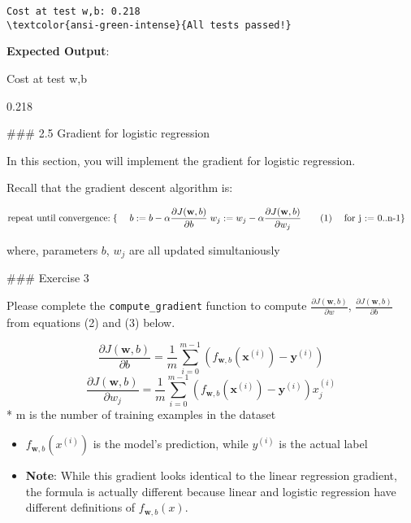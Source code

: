 \documentclass[11pt]{article}
\begin{document}
    \begin{Verbatim}[commandchars=\\\{\}]
Cost at test w,b: 0.218
\textcolor{ansi-green-intense}{All tests passed!}
    \end{Verbatim}

    \textbf{Expected Output}:

Cost at test w,b

0.218

    \#\#\# 2.5 Gradient for logistic regression

In this section, you will implement the gradient for logistic
regression.

Recall that the gradient descent algorithm is:

\[\begin{align*}& \text{repeat until convergence:} \; \lbrace \newline \; & b := b -  \alpha \frac{\partial J(\mathbf{w},b)}{\partial b} \newline       \; & w_j := w_j -  \alpha \frac{\partial J(\mathbf{w},b)}{\partial w_j} \tag{1}  \; & \text{for j := 0..n-1}\newline & \rbrace\end{align*}\]

where, parameters \(b\), \(w_j\) are all updated simultaniously

    \#\#\# Exercise 3

Please complete the \texttt{compute\_gradient} function to compute
\(\frac{\partial J(\mathbf{w},b)}{\partial w}\),
\(\frac{\partial J(\mathbf{w},b)}{\partial b}\) from equations (2) and
(3) below.

\[
\frac{\partial J(\mathbf{w},b)}{\partial b}  = \frac{1}{m} \sum\limits_{i = 0}^{m-1} (f_{\mathbf{w},b}(\mathbf{x}^{(i)}) - \mathbf{y}^{(i)}) \tag{2}
\] \[
\frac{\partial J(\mathbf{w},b)}{\partial w_j}  = \frac{1}{m} \sum\limits_{i = 0}^{m-1} (f_{\mathbf{w},b}(\mathbf{x}^{(i)}) - \mathbf{y}^{(i)})x_{j}^{(i)} \tag{3}
\] * m is the number of training examples in the dataset

\begin{itemize}
\item
  \(f_{\mathbf{w},b}(x^{(i)})\) is the model's prediction, while
  \(y^{(i)}\) is the actual label
\item
  \textbf{Note}: While this gradient looks identical to the linear
  regression gradient, the formula is actually different because linear
  and logistic regression have different definitions of
  \(f_{\mathbf{w},b}(x)\).
\end{itemize}
\end{document}
